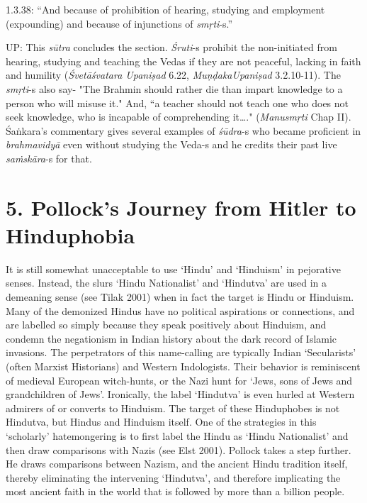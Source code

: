 1.3.38: “And because of prohibition of hearing, studying and employment (expounding) and because of injunctions of \textit{smṛti}-s.”

UP: This \textit{sūtra} concludes the section. \textit{Śruti}-s prohibit the non-initiated from hearing, studying and teaching the Vedas if they are not peaceful, lacking in faith and humility (\textit{Śvetāśvatara Upaniṣad } 6.22, \textit{MuṇḍakaUpaniṣad }3.2.10-11). The \textit{smṛti}-s also say- "The Brahmin should rather die than impart knowledge to a person who will misuse it." And, “a teacher should not teach one who does not seek knowledge, who is incapable of comprehending it…." (\textit{Manusmṛti} Chap II). Śaṅkara’s commentary gives several examples of \textit{śūdra}-s who became proficient in \textit{brahmavidyā} even without studying the Veda-s and he credits their past live \textit{saṁskāra}-s for that.


\section*{5. Pollock’s Journey from Hitler to Hinduphobia}

It is still somewhat unacceptable to use ‘Hindu’ and ‘Hinduism’ in pejorative senses. Instead, the slurs ‘Hindu Nationalist’ and ‘Hindutva’ are used in a demeaning sense (see Tilak 2001) when in fact the target is Hindu or Hinduism. Many of the demonized Hindus have no political aspirations or connections, and are labelled so simply because they speak positively about Hinduism, and condemn the negationism in Indian history about the dark record of Islamic invasions. The perpetrators of this name-calling are typically Indian ‘Secularists’ (often Marxist Historians) and Western Indologists. Their behavior is reminiscent of medieval European witch-hunts, or the Nazi hunt for ‘Jews, sons of Jews and grandchildren of Jews’. Ironically, the label ‘Hindutva’ is even hurled at Western admirers of or converts to Hinduism. The target of these Hinduphobes is not Hindutva, but Hindus and Hinduism itself. One of the strategies in this ‘scholarly’ hatemongering is to first label the Hindu as ‘Hindu Nationalist’ and then draw comparisons with Nazis (see Elst 2001). Pollock takes a step further. He draws comparisons between Nazism, and the ancient Hindu tradition itself, thereby eliminating the intervening ‘Hindutva’, and therefore implicating the most ancient faith in the world that is followed by more than a billion people.

